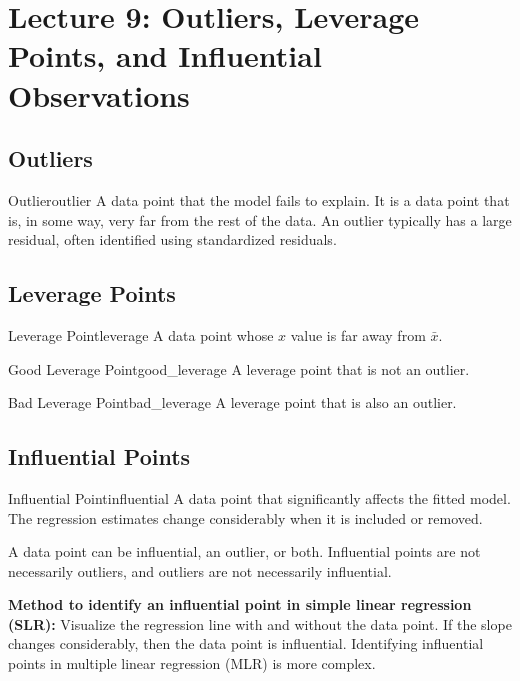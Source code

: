 \section{Lecture 9: Outliers, Leverage Points, and Influential Observations}

\subsection{Outliers}

\begin{defn}{Outlier}{outlier}
A data point that the model fails to explain. It is a data point that is, in some way, very far from the rest of the data. An outlier typically has a large residual, often identified using standardized residuals.
\end{defn}

\subsection{Leverage Points}

\begin{defn}{Leverage Point}{leverage}
A data point whose $x$ value is far away from $\bar{x}$.
\end{defn}

\begin{defn}{Good Leverage Point}{good_leverage}
A leverage point that is not an outlier.
\end{defn}

\begin{defn}{Bad Leverage Point}{bad_leverage}
A leverage point that is also an outlier.
\end{defn}

\subsection{Influential Points}

\begin{defn}{Influential Point}{influential}
A data point that significantly affects the fitted model. The regression estimates change considerably when it is included or removed.
\end{defn}

A data point can be influential, an outlier, or both. Influential points are not necessarily outliers, and outliers are not necessarily influential.

\begin{notebox}
\textbf{Method to identify an influential point in simple linear regression (SLR):} Visualize the regression line with and without the data point. If the slope changes considerably, then the data point is influential. Identifying influential points in multiple linear regression (MLR) is more complex.
\end{notebox}


